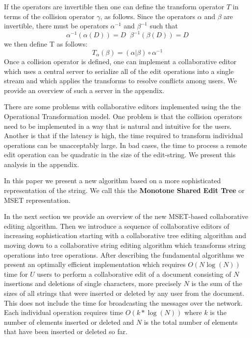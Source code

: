 \documentclass{amsart}
\begin{document}
If the operators are invertible then one can define 
the transform operator $T$ in terms of the collision
operator $\gamma$, as follows. Since the operators $\alpha$ 
and $\beta$ are invertible, there must be
operators $\alpha^{-1}$ and $\beta^{-1}$ such that
\[
\alpha^{-1}(\alpha(D)) = D \;\;
\beta^{-1}(\beta(D)) = D 
\]
we then define T as follows:
\[
T_\alpha(\beta) = (\alpha \vert \beta) \circ \alpha^{-1}
\]
Once a collision operator is defined, 
one can implement a collaborative editor which uses a central
server to serialize all of the edit operations into a single stream 
and which applies the transforms to resolve
conflicts among users.  We provide an overview of such a server in the appendix.

There are some problems with collaborative editors implemented
using the the Operational Transformation model.  One problem is that the
collision operators need to be implemented in a way that is natural and
intuitive for the users.  Another is that if the latency is high, the time
required to transform individual operations can be unacceptably large. In
bad cases, the time to process a remote edit operation can be quadratic
in the size of the edit-string. We present this analysis in the appendix.

In this paper we present a new algorithm based on a more sophisticated
representation of the string. We call this the 
{\bf Monotone Shared Edit Tree} or MSET representation. 

In the next section we provide an overview of the new MSET-based
collaborative editing algorithm.
Then we introduce a sequence of collaborative editors of increasing sophistication
starting with a collaborative tree editing algorithm and moving down to a collaborative
string editing algorithm which transforms string operations into tree operations.
After describing the fundamental algorithms we present an optimally efficient
implementation which requires $O(N\log(N))$ time for $U$ users to perform
a collaborative edit of a document consisting of $N$ insertions and deletions of
single characters, more precisely $N$ is the sum of the sizes of all strings that
were inserted or deleted by any user from the document. This does not include the
time for broadcasting the messages over the network. Each individual operation
requires time $O(k*\log(N))$ where $k$ is the number of elements inserted or deleted
and $N$ is the total number of elements that have been inserted or deleted so far.
\end{document}
